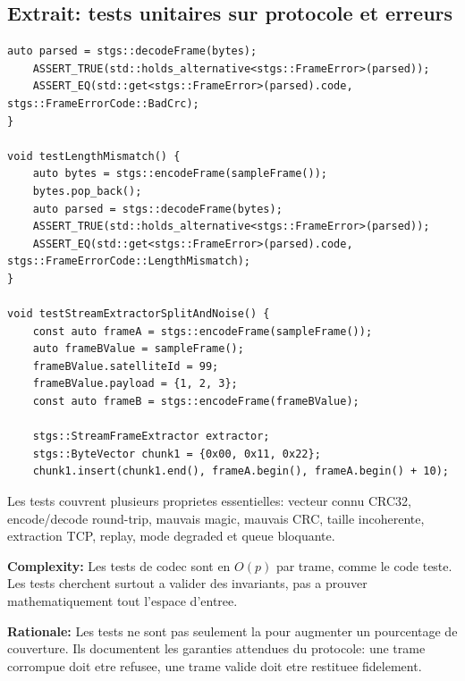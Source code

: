 \documentclass[10pt,a4paper]{article}
\newcommand{\complexity}[1]{\textbf{Complexity:} #1}
\newcommand{\rationale}[1]{\textbf{Rationale:} #1}
\begin{document}
\subsection{Extrait: tests unitaires sur protocole et erreurs}
\begin{lstlisting}[caption={Tests sur CRC, round-trip et erreurs}]
    auto parsed = stgs::decodeFrame(bytes);
    ASSERT_TRUE(std::holds_alternative<stgs::FrameError>(parsed));
    ASSERT_EQ(std::get<stgs::FrameError>(parsed).code, stgs::FrameErrorCode::BadCrc);
}

void testLengthMismatch() {
    auto bytes = stgs::encodeFrame(sampleFrame());
    bytes.pop_back();
    auto parsed = stgs::decodeFrame(bytes);
    ASSERT_TRUE(std::holds_alternative<stgs::FrameError>(parsed));
    ASSERT_EQ(std::get<stgs::FrameError>(parsed).code, stgs::FrameErrorCode::LengthMismatch);
}

void testStreamExtractorSplitAndNoise() {
    const auto frameA = stgs::encodeFrame(sampleFrame());
    auto frameBValue = sampleFrame();
    frameBValue.satelliteId = 99;
    frameBValue.payload = {1, 2, 3};
    const auto frameB = stgs::encodeFrame(frameBValue);

    stgs::StreamFrameExtractor extractor;
    stgs::ByteVector chunk1 = {0x00, 0x11, 0x22};
    chunk1.insert(chunk1.end(), frameA.begin(), frameA.begin() + 10);
\end{lstlisting}


Les tests couvrent plusieurs proprietes essentielles: vecteur connu CRC32, encode/decode round-trip, mauvais magic, mauvais CRC, taille incoherente, extraction TCP, replay, mode degraded et queue bloquante.

\complexity{Les tests de codec sont en $O(p)$ par trame, comme le code teste. Les tests cherchent surtout a valider des invariants, pas a prouver mathematiquement tout l'espace d'entree.}

\rationale{Les tests ne sont pas seulement la pour augmenter un pourcentage de couverture. Ils documentent les garanties attendues du protocole: une trame corrompue doit etre refusee, une trame valide doit etre restituee fidelement.}
\end{document}
